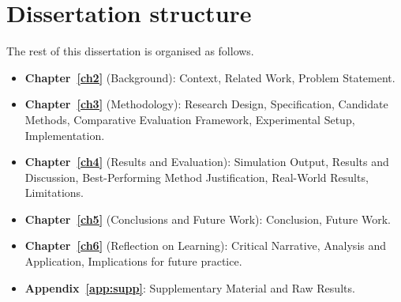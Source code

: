 

\section{Dissertation structure}\label{sec:roadmap}


The rest of this dissertation is organised as follows.
\begin{itemize}
  \item \textbf{Chapter~\ref{ch2}} (Background): Context, Related Work, Problem Statement.
  \item \textbf{Chapter~\ref{ch3}} (Methodology): Research Design, Specification, Candidate Methods, Comparative Evaluation Framework, Experimental Setup, Implementation.
  \item \textbf{Chapter~\ref{ch4}} (Results and Evaluation): Simulation Output, Results and Discussion, Best-Performing Method Justification, Real-World Results, Limitations.
  \item \textbf{Chapter~\ref{ch5}} (Conclusions and Future Work): Conclusion, Future Work.
  \item \textbf{Chapter~\ref{ch6}} (Reflection on Learning): Critical Narrative, Analysis and Application, Implications for future practice.
  \item \textbf{Appendix~\ref{app:supp}}: Supplementary Material and Raw Results.
\end{itemize}

